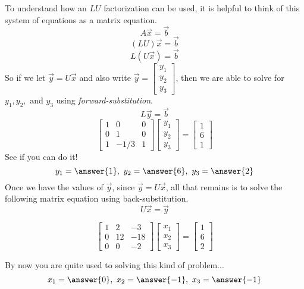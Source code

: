 \documentclass{ximera}
\begin{document}
\begin{example}
To understand how an $LU$ factorization can be used, it is helpful to think of this system of equations as a matrix equation.
$$A\vec{x}=\vec{b}$$
$$(LU)\vec{x}=\vec{b}$$
$$L(U\vec{x})=\vec{b}$$
So if we let $\vec{y}=U\vec{x}$ and also write $\vec{y}=\begin{bmatrix} y_1 \\ y_2 \\ y_3 \end{bmatrix}$, then we are able to solve for $ y_1, y_2, \text{ and } y_3$ using \emph{forward-substitution}.
$$L\vec{y}=\vec{b}$$
\[
\begin{bmatrix}
1 & 0 & 0 \\
0 & 1 & 0 \\
1  & -1/3  & 1
\end{bmatrix}
\begin{bmatrix} y_1 \\ y_2 \\ y_3 \end{bmatrix}
=
\begin{bmatrix} 1 \\ 6 \\ 1 \end{bmatrix}
\]
See if you can do it!
$$y_1=\answer{1},\quad y_2=\answer{6},\quad y_3=\answer{2}$$
Once we have the values of $\vec{y}$, since $\vec{y}=U\vec{x}$, all that remains is to solve the following matrix equation using back-substitution.
$$U\vec{x}=\vec{y}$$
 

$$\begin{bmatrix}
1 & 2 & -3 \\
0 & 12  & -18 \\
0 & 0 & -2
\end{bmatrix}
\begin{bmatrix} x_1 \\ x_2 \\ x_3 \end{bmatrix}
=
\begin{bmatrix} 1 \\ 6 \\ 2 \end{bmatrix}$$
 

 
By now you are quite used to solving this kind of problem...
$$x_1=\answer{0},\quad x_2=\answer{-1},\quad x_3=\answer{-1}$$

\end{example}



 
 
\end{document}
